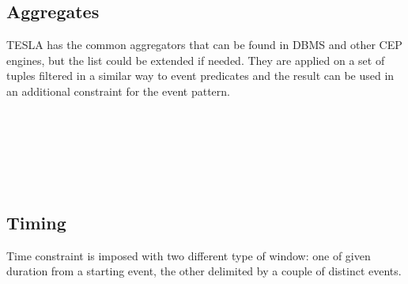 \subsection{Aggregates}
TESLA has the common aggregators that can be found in DBMS and other CEP engines, but the list could be extended if needed. They are applied on a set of tuples filtered in a similar way to event predicates and the result can be used in an additional constraint for the event pattern.
\begin{bnf*}
\\
\\
\\
\\
\\
\end{bnf*}

\subsection{Timing}
Time constraint is imposed with two different type of window: one of given duration from a starting event, the other delimited by a couple of distinct events.
\begin{bnf*}
\\
\\
\\
\\
\end{bnf*}

